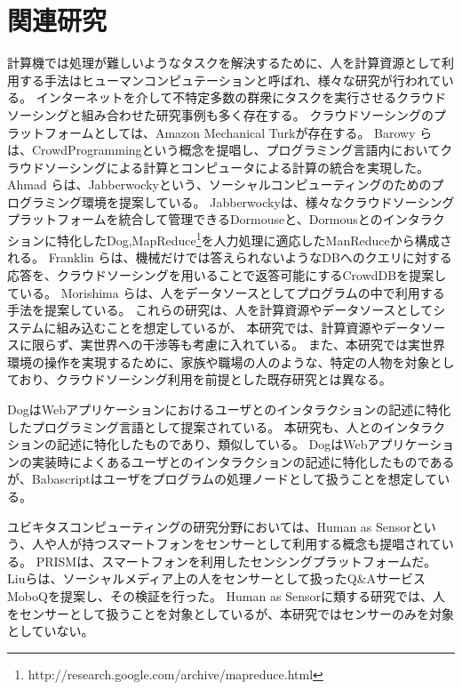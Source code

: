 \documentclass[twoside]{wiss}
\begin{document}
\section{関連研究}

計算機では処理が難しいようなタスクを解決するために、人を計算資源として利用する手法はヒューマンコンピュテーション\cite{humancomputation}と呼ばれ、様々な研究が行われている。
インターネットを介して不特定多数の群衆にタスクを実行させるクラウドソーシングと組み合わせた研究事例も多く存在する。
クラウドソーシングのプラットフォームとしては、Amazon Mechanical Turk\cite{mechanicalturk}が存在する。
Barowy らは、CrowdProgrammingという概念を提唱し、プログラミング言語内においてクラウドソーシングによる計算とコンピュータによる計算の統合を実現した\cite{automan}。
Ahmad らは、Jabberwocky\cite{jabberwocky}という、ソーシャルコンピューティングのためのプログラミング環境を提案している。
Jabberwockyは、様々なクラウドソーシングプラットフォームを統合して管理できるDormouseと、Dormousとのインタラクションに特化したDog,MapReduce\footnote{http://research.google.com/archive/mapreduce.html}を人力処理に適応したManReduceから構成される。
Franklin らは、機械だけでは答えられないようなDBへのクエリに対する応答を、クラウドソーシングを用いることで返答可能にするCrowdDBを提案している\cite{crowddb}。
Morishima らは、人をデータソースとしてプログラムの中で利用する手法を提案している\cite{cylog}。
これらの研究は、人を計算資源やデータソースとしてシステムに組み込むことを想定しているが、
本研究では、計算資源やデータソースに限らず、実世界への干渉等も考慮に入れている。
また、本研究では実世界環境の操作を実現するために、家族や職場の人のような、特定の人物を対象としており、クラウドソーシング利用を前提とした既存研究とは異なる。

Dog\cite{dog}はWebアプリケーションにおけるユーザとのインタラクションの記述に特化したプログラミング言語として提案されている。
本研究も、人とのインタラクションの記述に特化したものであり、類似している。
DogはWebアプリケーションの実装時によくあるユーザとのインタラクションの記述に特化したものであるが、Babascriptはユーザをプログラムの処理ノードとして扱うことを想定している。

ユビキタスコンピューティングの研究分野においては、Human as Sensorという、人や人が持つスマートフォンをセンサーとして利用する概念も提唱されている。
PRISMは、スマートフォンを利用したセンシングプラットフォームだ\cite{prism}。
Liuらは、ソーシャルメディア上の人をセンサーとして扱ったQ\&AサービスMoboQを提案し、その検証を行った。
Human as Sensorに類する研究では、人をセンサーとして扱うことを対象としているが、本研究ではセンサーのみを対象としていない。
\end{document}
